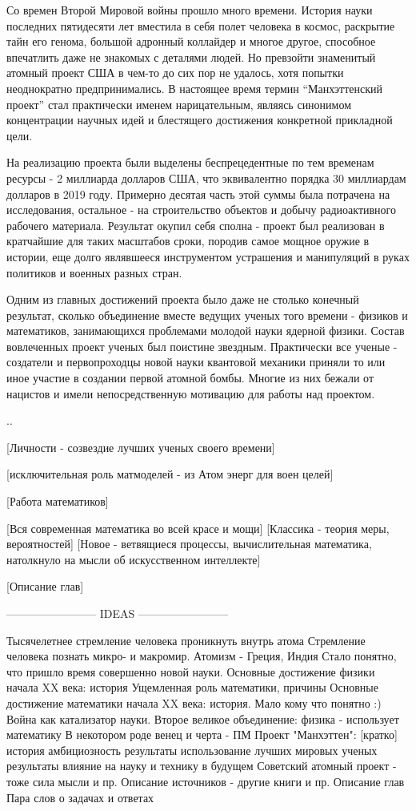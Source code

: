 Со времен Второй Мировой войны прошло много времени.
История науки последних пятидесяти лет вместила в себя полет человека в космос, раскрытие тайн его генома, большой адронный коллайдер и многое другое, способное впечатлить даже не знакомых с деталями людей.
Но превзойти знаменитый атомный проект США в чем-то до сих пор не удалось, хотя попытки неоднократно предпринимались.
В настоящее время термин ``Манхэттенский проект'' стал практически именем нарицательным, являясь синонимом концентрации научных идей и блестящего достижения конкретной прикладной цели.

На реализацию проекта были выделены беспрецедентные по тем временам ресурсы - 
2 миллиарда долларов США, что эквивалентно порядка 30 миллиардам долларов в 2019 году. 
Примерно десятая часть этой суммы была потрачена на исследования, остальное - на строительство объектов и добычу радиоактивного рабочего материала.
Результат окупил себя сполна - проект был реализован в кратчайшие для таких масштабов сроки, породив самое мощное оружие в истории, еще долго являвшееся инструментом устрашения и манипуляций в руках политиков и военных разных стран.

Одним из главных достижений проекта было даже не столько конечный результат, сколько объединение вместе ведущих ученых того времени -  физиков и математиков, занимающихся проблемами молодой науки ядерной физики. 
Состав вовлеченных проект ученых был поистине звездным.
Практически все ученые - создатели и первопроходцы новой науки квантовой механики приняли то или иное участие в создании первой атомной бомбы.
Многие из них бежали от нацистов и имели непосредственную мотивацию для работы над проектом.


..

[Личности - созвездие лучших ученых своего времени]

[исключительная роль матмоделей - из Атом энерг для воен целей]

[Работа математиков]

[Вся современная математика во всей красе и мощи]
[Классика - теория меры, вероятностей]
[Новое - ветвящиеся процессы, вычислительная математика, натолкнуло на мысли об искусственном интеллекте]

[Описание глав]



------------------------ IDEAS ------------------------ 

Тысячелетнее стремление человека проникнуть внутрь атома
Стремление человека познать микро- и макромир. Атомизм - Греция, Индия
Стало понятно, что пришло время совершенно новой науки.
Основные достижение физики начала XX века: история
Ущемленная роль математики, причины 
Основные достижение математики начала XX века: история. Мало кому что понятно :)
Война как катализатор науки.
Второе великое объединение: физика - использует математику
В некотором роде венец и черта - ПМ
Проект "Манхэттен": [кратко]
    история
    амбициозность
    результаты
    использование лучших мировых ученых
    результаты
    влияние на науку и технику в будущем
Советский атомный проект - тоже сила мысли и пр.
Описание источников - другие книги и пр.
Описание глав
Пара слов о задачах и ответах



